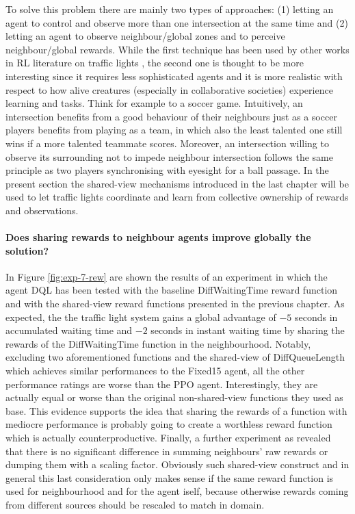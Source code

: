 To solve this problem there are mainly two types of approaches: (1) letting an agent to control and observe more than one intersection at the same time and (2) letting an agent to observe neighbour/global zones and to perceive neighbour/global rewards.
While the first technique has been used by other works in RL literature on traffic lights \cite{wei2019presslight}, the second one is thought to be more interesting since it requires less sophisticated agents and it is more realistic with respect to how alive creatures (especially in collaborative societies) experience learning and tasks. Think for example to a soccer game.
Intuitively, an intersection benefits from a good behaviour of their neighbours just as a soccer players benefits from playing as a team, in which also the least talented one still wins if a more talented teammate scores.
Moreover, an intersection willing to observe its surrounding not to impede neighbour intersection follows the same principle as two players synchronising with eyesight for a ball passage.
In the present section the shared-view mechanisms introduced in the last chapter will be used to let traffic lights coordinate and learn from collective ownership of rewards and observations.

\paragraph{Does sharing rewards to neighbour agents improve globally the solution?}

In Figure \ref{fig:exp-7-rew} are shown the results of an experiment in which the agent DQL has been tested with the baseline DiffWaitingTime reward function and with the shared-view reward functions presented in the previous chapter.
As expected, the the traffic light system gains a global advantage of $-5$ seconds in accumulated waiting time and $-2$ seconds in instant waiting time by sharing the rewards of the DiffWaitingTime function in the neighbourhood.
Notably, excluding two aforementioned functions and the shared-view of DiffQueueLength which achieves similar performances to the Fixed15 agent, all the other performance ratings are worse than the PPO agent.
Interestingly, they are actually equal or worse than the original non-shared-view functions they used as base.
This evidence supports the idea that sharing the rewards of a function with mediocre performance is probably going to create a worthless reward function which is actually counterproductive.
Finally, a further experiment as revealed that there is no significant difference in summing neighbours' raw rewards or dumping them with a scaling factor.
Obviously such shared-view construct and in general this last consideration only makes sense if the same reward function is used for neighbourhood and for the agent iself, because otherwise rewards coming from different sources should be rescaled to match in domain.

